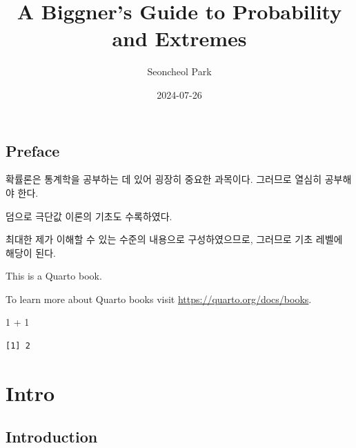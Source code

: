\documentclass[
  letterpaper,
  DIV=11,
  numbers=noendperiod]{scrreprt}
\title{A Biggner's Guide to Probability and Extremes}
\author{Seoncheol Park}
\date{2024-07-26}
\newenvironment{Shaded}{\begin{snugshade}}{\end{snugshade}}
\newcommand{\DecValTok}[1]{\textcolor[rgb]{0.68,0.00,0.00}{#1}}
\newcommand{\SpecialCharTok}[1]{\textcolor[rgb]{0.37,0.37,0.37}{#1}}
\renewcommand*\contentsname{Table of contents}
\newcommand\contentsname{Table of contents}
\theoremstyle{plain}
\theoremstyle{definition}
\theoremstyle{definition}
\theoremstyle{plain}
\theoremstyle{plain}
\theoremstyle{remark}
\begin{document}
\maketitle

\renewcommand{\Return}{\State \textbf{return}~}
\newcommand{\Print}{\State \textbf{print}~}
\newcommand{\Break}{\State \textbf{break}}
\newcommand{\Continue}{\State \textbf{continue}}
\newcommand{\True}{\textbf{true}}
\newcommand{\False}{\textbf{false}}
\renewcommand{\And}{\textbf{and}~}
\newcommand{\Or}{\textbf{or}~}
\renewcommand{\Not}{\textbf{not}~}
\newcommand{\To}{\textbf{to}~}
\newcommand{\DownTo}{\textbf{downto}~}


\renewcommand*\contentsname{Table of contents}
{
\hypersetup{linkcolor=}
\setcounter{tocdepth}{2}
\tableofcontents
}
\chapter*{Preface}\label{preface}


확률론은 통계학을 공부하는 데 있어 굉장히 중요한 과목이다. 그러므로
열심히 공부해야 한다.

덤으로 극단값 이론의 기초도 수록하였다.

최대한 제가 이해할 수 있는 수준의 내용으로 구성하였으므로, 그러므로 기초
레벨에 해당이 된다.

This is a Quarto book.

To learn more about Quarto books visit
\url{https://quarto.org/docs/books}.

\begin{Shaded}
\begin{Highlighting}[]
\DecValTok{1} \SpecialCharTok{+} \DecValTok{1}
\end{Highlighting}
\end{Shaded}

\begin{verbatim}
[1] 2
\end{verbatim}

\part{Intro}

\chapter{Introduction}\label{introduction}
\end{document}
